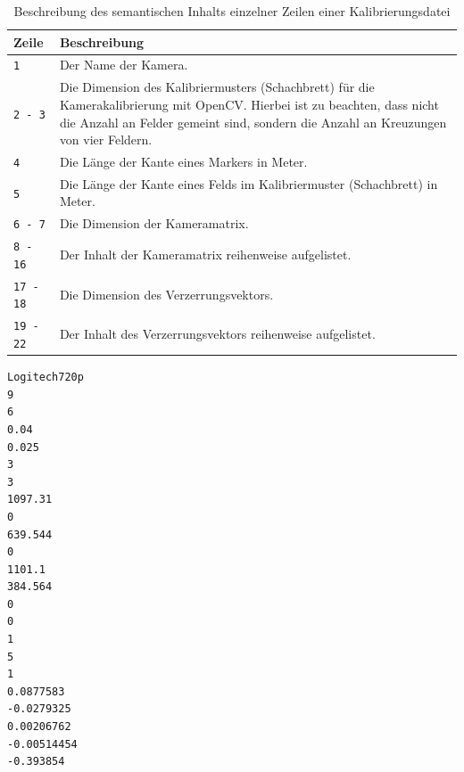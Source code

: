 \begin{table}[H]
\centering
\begin{tabular}{|p{3cm}|p{12cm}|}
\hline
\textbf{Zeile} & \textbf{Beschreibung} \\
\hline
\verb|1| & Der Name der Kamera.\\
\hline
\verb|2 - 3| & Die Dimension des Kalibriermusters (Schachbrett) für die Kamerakalibrierung mit OpenCV. Hierbei ist zu beachten, dass nicht die Anzahl an Felder gemeint sind, sondern die Anzahl an Kreuzungen von vier Feldern.\\
\hline
\verb|4| & Die Länge der Kante eines Markers in Meter.\\
\hline
\verb|5| & Die Länge der Kante eines Felds im Kalibriermuster (Schachbrett) in Meter.\\
\hline
\verb|6 - 7| & Die Dimension der Kameramatrix.\\
\hline
\verb|8 - 16| & Der Inhalt der Kameramatrix reihenweise aufgelistet.\\
\hline
\verb|17 - 18| & Die Dimension des Verzerrungsvektors.\\
\hline
\verb|19 - 22| & Der Inhalt des Verzerrungsvektors reihenweise aufgelistet.\\
\hline
\end{tabular}
\caption{Beschreibung des semantischen Inhalts einzelner Zeilen einer Kalibrierungsdatei}
\label{tab:cccFile}
\end{table}

\begin{lstlisting}[caption={Struktur einer Datei, die eine Kamerakalibrierung speichert und die Dateiendung \grqq \texttt{.ccc}\grqq{} aufweist}, label={lst:cccFile}]
Logitech720p
9
6
0.04
0.025
3
3
1097.31
0
639.544
0
1101.1
384.564
0
0
1
5
1
0.0877583
-0.0279325
0.00206762
-0.00514454
-0.393854
\end{lstlisting}

